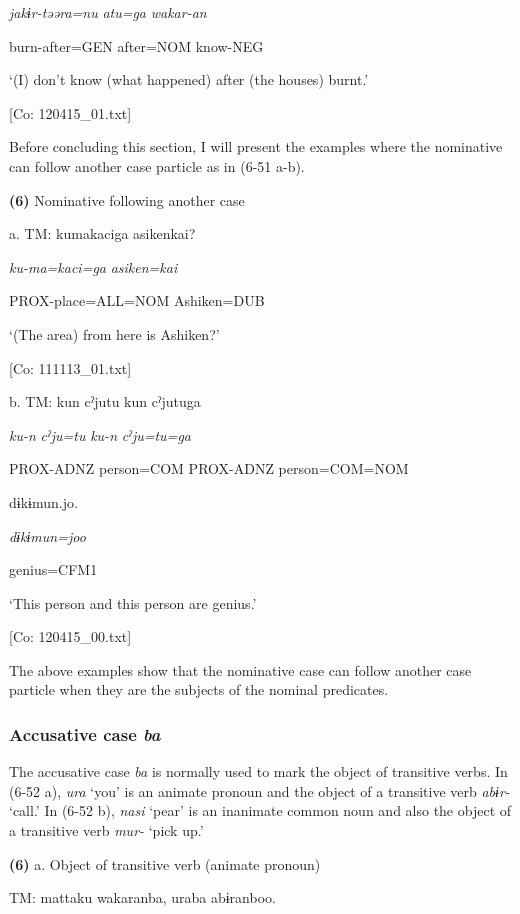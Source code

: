      \textit{jakɨr-təəra=nu}  \textit{atu=ga}  \textit{wakar-an}

      burn-after=GEN  after=NOM  know-NEG

      ‘(I) don’t know (what happened) after (the houses) burnt.’

      [Co: 120415\_01.txt]

  Before concluding this section, I will present the examples where the nominative can follow another case particle as in (6-51 a-b).

\textbf{(6)}  Nominative following another case

  a.  TM:  kumakaciga  asikenkai?

      \textit{ku-ma=kaci=ga}  \textit{asiken=kai}

      PROX-place=ALL=NOM  Ashiken=DUB

      ‘(The area) from here is Ashiken?’

      [Co: 111113\_01.txt]

  b.  TM:  kun  cˀjutu  kun  cˀjutuga

      \textit{ku-n}  \textit{cˀju=tu}  \textit{ku-n}  \textit{cˀju=tu=ga}

      PROX-ADNZ  person=COM  PROX-ADNZ  person=COM=NOM

      dɨkɨmun.jo.

      \textit{dɨkɨmun=joo}

      genius=CFM1

      ‘This person and this person are genius.’

      [Co: 120415\_00.txt]

The above examples show that the nominative case can follow another case particle when they are the subjects of the nominal predicates.

\subsubsection{Accusative case \textit{ba}}

The accusative case \textit{ba} is normally used to mark the object of transitive verbs. In (6-52 a), \textit{ura} ‘you’ is an animate pronoun and the object of a transitive verb \textit{abɨr-} ‘call.’ In (6-52 b), \textit{nasi} ‘pear’ is an inanimate common noun and also the object of a transitive verb \textit{mur{}-} ‘pick up.’

\textbf{(6)}  a.  Object of transitive verb (animate pronoun)

    TM:  mattaku  wakaranba,  uraba  abɨranboo.

